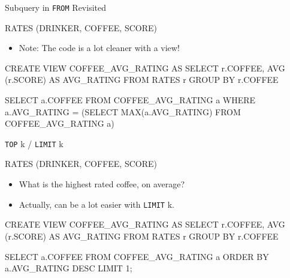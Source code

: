 \documentclass[aspectratio=169]{beamer}
\newenvironment{noindentitemize}
{ \begin{itemize}
 \setlength{\itemsep}{1.5ex}
  \setlength{\parsep}{0pt}   
  \setlength{\parskip}{0pt}
 \addtolength{\leftskip}{-2em}
 }
{ \end{itemize} }
\begin{document}
\begin{frame}[fragile]{Subquery in \texttt{FROM} Revisited}

RATES (DRINKER, COFFEE, SCORE)

\begin{noindentitemize}
\item Note: The code is a lot cleaner with a view!
\end{noindentitemize}

\begin{SQL}
CREATE VIEW COFFEE_AVG_RATING AS
SELECT r.COFFEE, AVG (r.SCORE) AS AVG_RATING
FROM RATES r
GROUP BY r.COFFEE
\end{SQL}

\begin{SQL}
SELECT a.COFFEE
FROM COFFEE_AVG_RATING a
WHERE a.AVG_RATING = (SELECT MAX(a.AVG_RATING)
                      FROM COFFEE_AVG_RATING a)
\end{SQL}
\end{frame}


\begin{frame}[fragile]{\texttt{TOP} k / \texttt{LIMIT} k}

RATES (DRINKER, COFFEE, SCORE)

\begin{itemize}
\item What is the highest rated coffee, on average?
\item Actually, can be a lot easier with \texttt{LIMIT} k.
\end{itemize}

\begin{SQL}
CREATE VIEW COFFEE_AVG_RATING AS
SELECT r.COFFEE, AVG (r.SCORE) AS AVG_RATING
FROM RATES r
GROUP BY r.COFFEE
\end{SQL}

\begin{SQL}
SELECT  a.COFFEE
FROM COFFEE_AVG_RATING a
ORDER BY a.AVG_RATING DESC LIMIT 1;
\end{SQL}
\end{frame}
\end{document}
